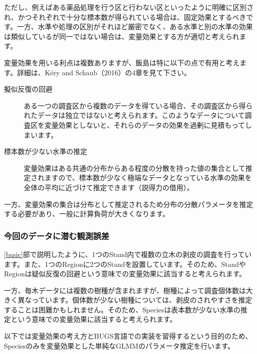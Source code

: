 ただし、例えばある薬品処理を行う区と行わない区といったように明確に区別され、かつそれぞれで十分な標本数が得られている場合は、固定効果とするべきです。一方、水準や処理の区別がそれほど厳密でなく、ある水準と別の水準の効果は類似しているが同一ではない場合は、変量効果とする方が適切と考えられます。

変量効果を用いる利点は複数ありますが、飯島は特に以下の点で有用と考えます。詳細は、K\'{e}ry and Schaub（2016）の4章を見て下さい。
\begin{description}
\item[擬似反復の回避]ある一つの調査区から複数のデータを得ている場合、その調査区から得られたデータは独立ではないと考えられます。このようなデータについて調査区を変量効果としないと、それらのデータの効果を過剰に見積もってしまいます。
\item[標本数が少ない水準の推定]変量効果はある共通の分布からある程度の分散を持った値の集合として推定されますので、標本数が少なく極端なデータとなっている水準の効果を全体の平均に近づけて推定できます（説得力の借用）。
\end{description}
一方、変量効果の集合は分布として推定されるため分布の分散パラメータを推定する必要があり、一般に計算負荷が大きくなります。

    \subsubsection{今回のデータに潜む観測誤差}
\ref{basic}部で説明したように、1つのStand内で複数の立木の剥皮の調査を行っています。また、1つのRegionに2つのStandを設置しています。そのため、StandやRegionは疑似反復の回避という意味での変量効果に該当すると考えられます。

一方、毎木データには複数の樹種が含まれますが、樹種によって調査個体数は大きく異なっています。個体数が少ない樹種については、剥皮のされやすさを推定することは困難かもしれません。そのため、Speciesは表本数が少ない水準の推定という意味での変量効果に該当すると考えられます。

以下では変量効果の考え方とBUGS言語での実装を習得するという目的のため、Speciesのみを変量効果とした単純なGLMMのパラメータ推定を行います。


